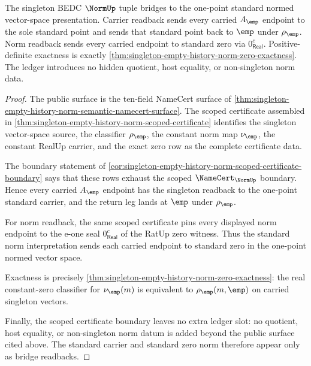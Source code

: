 \begin{theorem}
\label{thm:singleton-empty-history-norm-standard-bridge-boundary}
The singleton BEDC $\NormUp$ tuple bridges to the one-point standard normed
vector-space presentation. Carrier readback sends every carried $A_{\emp}$
endpoint to the sole standard point and sends that standard point back to
$\emp$ under $\rho_{\emp}$. Norm readback sends every carried endpoint to
standard zero via $0_{\mathsf{Real}}^{c}$. Positive-definite exactness is
exactly \autoref{thm:singleton-empty-history-norm-zero-exactness}. The ledger
introduces no hidden quotient, host equality, or non-singleton norm data.
\end{theorem}
\begin{proof}
The public surface is the ten-field NameCert surface of
\autoref{thm:singleton-empty-history-norm-semantic-namecert-surface}. The
scoped certificate assembled in
\autoref{thm:singleton-empty-history-norm-scoped-certificate} identifies the
singleton vector-space source, the classifier $\rho_{\emp}$, the constant norm
map $\nu_{\emp}$, the constant RealUp carrier, and the exact zero row as the
complete certificate data.

The boundary statement of
\autoref{cor:singleton-empty-history-norm-scoped-certificate-boundary} says
that these rows exhaust the scoped $\NameCert_{\NormUp}$ boundary. Hence every
carried $A_{\emp}$ endpoint has the singleton readback to the one-point
standard carrier, and the return leg lands at $\emp$ under $\rho_{\emp}$.

For norm readback, the same scoped certificate pins every displayed norm
endpoint to the e-one seal $0_{\mathsf{Real}}^{c}$ of the RatUp zero witness.
Thus the standard norm interpretation sends each carried endpoint to standard
zero in the one-point normed vector space.

Exactness is precisely
\autoref{thm:singleton-empty-history-norm-zero-exactness}: the real
constant-zero classifier for $\nu_{\emp}(m)$ is equivalent to
$\rho_{\emp}(m,\emp)$ on carried singleton vectors.

Finally, the scoped certificate boundary leaves no extra ledger slot: no
quotient, host equality, or non-singleton norm datum is added beyond the public
surface cited above. The standard carrier and standard zero norm therefore
appear only as bridge readbacks.
\end{proof}


